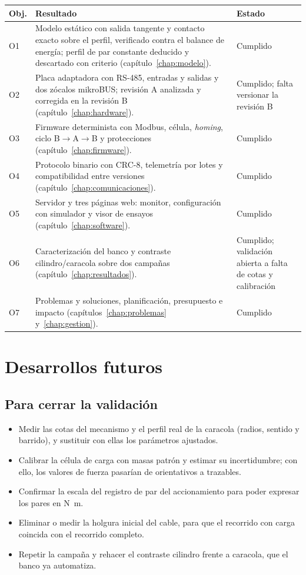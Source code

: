\begin{longtable}{@{}L{0.07\textwidth}L{0.58\textwidth}L{0.25\textwidth}@{}}
\toprule
\textbf{Obj.} & \textbf{Resultado} & \textbf{Estado} \\
\midrule
\endhead
O1 & Modelo estático con salida tangente y contacto exacto sobre el perfil, verificado contra el balance de energía; perfil de par constante deducido y descartado con criterio (capítulo~\ref{chap:modelo}). & Cumplido \\
O2 & Placa adaptadora con RS-485, entradas y salidas y dos zócalos mikroBUS; revisión A analizada y corregida en la revisión B (capítulo~\ref{chap:hardware}). & Cumplido; falta versionar la revisión B \\
O3 & Firmware determinista con Modbus, célula, \emph{homing}, ciclo B$\rightarrow$A$\rightarrow$B y protecciones (capítulo~\ref{chap:firmware}). & Cumplido \\
O4 & Protocolo binario con CRC-8, telemetría por lotes y compatibilidad entre versiones (capítulo~\ref{chap:comunicaciones}). & Cumplido \\
O5 & Servidor y tres páginas web: monitor, configuración con simulador y visor de ensayos (capítulo~\ref{chap:software}). & Cumplido \\
O6 & Caracterización del banco y contraste cilindro/caracola sobre dos campañas (capítulo~\ref{chap:resultados}). & Cumplido; validación abierta a falta de cotas y calibración \\
O7 & Problemas y soluciones, planificación, presupuesto e impacto (capítulos~\ref{chap:problemas} y~\ref{chap:gestion}). & Cumplido \\
\bottomrule
\end{longtable}

\section{Desarrollos futuros}

\subsection{Para cerrar la validación}
\begin{itemize}
  \item Medir las cotas del mecanismo y el perfil real de la caracola (radios, sentido y barrido), y
        sustituir con ellas los parámetros ajustados.
  \item Calibrar la célula de carga con masas patrón y estimar su incertidumbre; con ello, los
        valores de fuerza pasarían de orientativos a trazables.
  \item Confirmar la escala del registro de par del accionamiento para poder expresar los pares en
        \si{\newton\metre}.
  \item Eliminar o medir la holgura inicial del cable, para que el recorrido con carga coincida con
        el recorrido completo.
  \item Repetir la campaña y rehacer el contraste cilindro frente a caracola, que el banco ya
        automatiza.
\end{itemize}

